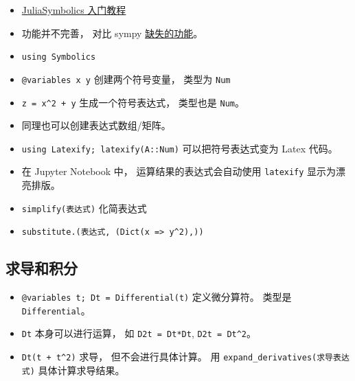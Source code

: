
\begin{itemize}
\item \href{https://symbolics.juliasymbolics.org/dev/tutorials/symbolic_functions/}{JuliaSymbolics 入门教程}
\item 功能并不完善， 对比 sympy \href{https://github.com/JuliaSymbolics/Symbolics.jl/issues/59}{缺失的功能}。
\item \verb|using Symbolics|
\item \verb|@variables x y| 创建两个符号变量， 类型为 \verb|Num|
\item \verb|z = x^2 + y| 生成一个符号表达式， 类型也是 \verb|Num|。
\item 同理也可以创建表达式数组/矩阵。
\item \verb|using Latexify; latexify(A::Num)| 可以把符号表达式变为 Latex 代码。
\item 在 Jupyter Notebook 中， 运算结果的表达式会自动使用 \verb|latexify| 显示为漂亮排版。
\item \verb|simplify(表达式)| 化简表达式
\item \verb|substitute.(表达式, (Dict(x => y^2),))|
\end{itemize}


\subsection{求导和积分}
\begin{itemize}
\item \verb|@variables t; Dt = Differential(t)| 定义微分算符。 类型是 \verb|Differential|。
\item \verb|Dt| 本身可以进行运算， 如 \verb|D2t = Dt*Dt|, \verb|D2t = Dt^2|。
\item \verb|Dt(t + t^2)| 求导， 但不会进行具体计算。 用 \verb|expand_derivatives(求导表达式)| 具体计算求导结果。
\end{itemize}
